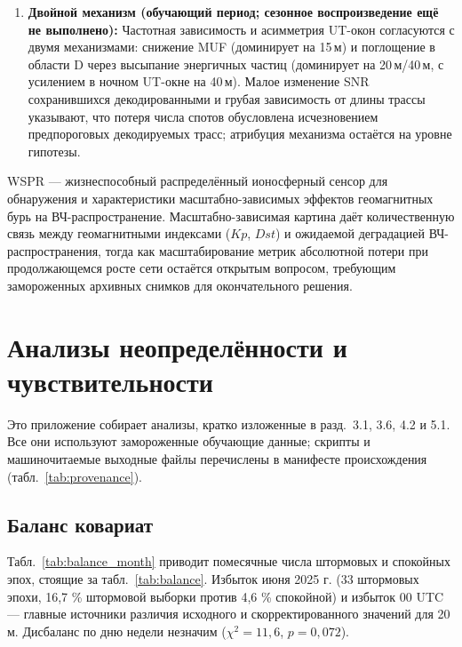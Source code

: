 \documentclass{agujournal2019}
\begin{document}
{\begin{enumerate}
	      уровня на $\SI{+35}{\percent}$, но широкий 95 \% ДИ [0,65; 2,33]
	      совместим как с пропорциональным ростом, так и с инвариантностью).
	      Поэтому абсолютная потеря совместима с масштабированием,
	      связанным с сетью, но не установлена окончательно; процентные снижения остаются более стабильной метрикой.
	\item \textbf{Двойной механизм (обучающий период; сезонное воспроизведение ещё не выполнено):} Частотная зависимость и асимметрия
	      UT-окон согласуются с двумя механизмами: снижение MUF
	      (доминирует на 15\,м) и поглощение в области D через высыпание
	      энергичных частиц (доминирует на 20\,м/40\,м, с усилением
	      в ночном UT-окне на 40\,м). Малое изменение SNR сохранившихся декодированными и грубая
	      зависимость от длины трассы указывают, что потеря числа спотов
	      обусловлена исчезновением предпороговых декодируемых трасс;
	      атрибуция механизма остаётся на уровне гипотезы.
\end{enumerate}
\par}

WSPR — жизнеспособный распределённый ионосферный сенсор для обнаружения
и характеристики масштабно-зависимых эффектов геомагнитных бурь на
ВЧ-распространение. Масштабно-зависимая картина даёт количественную связь
между геомагнитными индексами ($Kp$, $Dst$) и ожидаемой деградацией
ВЧ-распространения, тогда как масштабирование метрик абсолютной потери
при продолжающемся росте сети остаётся открытым вопросом, требующим
замороженных архивных снимков для окончательного решения.


\appendix
\section{Анализы неопределённости и чувствительности}
\label{app:sensitivity}

Это приложение собирает анализы, кратко изложенные в разд.~3.1, 3.6,
4.2 и 5.1. Все они используют замороженные обучающие данные; скрипты
и машиночитаемые выходные файлы перечислены в манифесте происхождения
(табл.~\ref{tab:provenance}).

\subsection{Баланс ковариат}

Табл.~\ref{tab:balance_month} приводит помесячные числа штормовых
и спокойных эпох, стоящие за табл.~\ref{tab:balance}. Избыток июня 2025 г.
(33 штормовых эпохи, 16,7 \% штормовой выборки против 4,6 \% спокойной)
и избыток 00 UTC — главные источники различия исходного и скорректированного
значений для 20\,м. Дисбаланс по дню недели незначим
($\chi^2 = 11{,}6$, $p = 0{,}072$).
\end{document}
